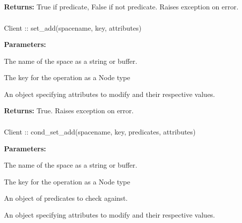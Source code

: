 \noindent\textbf{Returns:}
True if predicate, False if not predicate.  Raises exception on error.

\subsubsection{}
\label{api:nodejs:set_add}
\begin{javascriptcode}
Client :: set_add(spacename, key, attributes)
\end{javascriptcode}
\funcdesc 

\noindent\textbf{Parameters:}
\begin{description}[labelindent=\widthof{{\code{attributes}}},leftmargin=*,noitemsep,nolistsep,align=right]
\item[\code{spacename}] The name of the space as a string or buffer.
\item[\code{key}] The key for the operation as a Node type
\item[\code{attributes}] An object specifying attributes to modify and their respective values.
\end{description}

\noindent\textbf{Returns:}
True.  Raises exception on error.

\subsubsection{}
\label{api:nodejs:cond_set_add}
\begin{javascriptcode}
Client :: cond_set_add(spacename, key, predicates, attributes)
\end{javascriptcode}
\funcdesc 

\noindent\textbf{Parameters:}
\begin{description}[labelindent=\widthof{{\code{predicates}}},leftmargin=*,noitemsep,nolistsep,align=right]
\item[\code{spacename}] The name of the space as a string or buffer.
\item[\code{key}] The key for the operation as a Node type
\item[\code{predicates}] An object of predicates to check against.
\item[\code{attributes}] An object specifying attributes to modify and their respective values.
\end{description}

